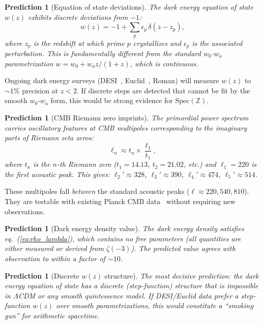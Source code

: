 \documentclass[11pt,a4paper]{article}
\newtheorem{prediction}[theorem]{Prediction}
\newcommand{\Spec}{\mathrm{Spec}}
\begin{document}
\begin{prediction}[Equation of state deviations]
\label{pred:wz}
The dark energy equation of state $w(z)$ exhibits discrete
deviations from $-1$:
\begin{equation}
  w(z) = -1 + \sum_p \epsilon_p \, \delta(z - z_p),
\end{equation}
where $z_p$ is the redshift at which prime $p$ crystallizes
and $\epsilon_p$ is the associated perturbation.
This is fundamentally different from the standard
$w_0$-$w_a$ parametrization $w = w_0 + w_a z/(1+z)$,
which is continuous.
\end{prediction}

Ongoing dark energy surveys (DESI~\cite{DESI2024},
Euclid~\cite{Euclid2024}, Roman) will measure $w(z)$ to
$\sim 1\%$ precision at $z < 2$. If discrete steps are
detected that cannot be fit by the smooth $w_0$-$w_a$ form,
this would be strong evidence for $\Spec(\mathbb{Z})$.

\begin{prediction}[CMB Riemann zero imprints]
\label{pred:cmb}
The primordial power spectrum carries oscillatory features
at CMB multipoles corresponding to the imaginary parts of
Riemann zeta zeros:
\begin{equation}
  \ell_n \approx t_n \times \frac{\ell_1}{t_1},
\end{equation}
where $t_n$ is the $n$-th Riemann zero ($t_1 = 14.13$,
$t_2 = 21.02$, etc.) and $\ell_1 = 220$ is the first
acoustic peak. This gives:
$\ell_2' \approx 328$, $\ell_3' \approx 390$,
$\ell_4' \approx 474$, $\ell_5' \approx 514$.
\end{prediction}

These multipoles fall \emph{between} the standard acoustic peaks
($\ell \approx 220, 540, 810$). They are testable with existing
Planck CMB data~\cite{Planck2018} without requiring new observations.

\begin{prediction}[Dark energy density value]
\label{pred:value}
The dark energy density satisfies
eq.~(\ref{eq:rho_lambda}), which contains no free parameters
(all quantities are either measured or derived from $\zeta(-3)$).
The predicted value agrees with observation to within a
factor of $\sim 10$.
\end{prediction}

\begin{prediction}[Discrete $w(z)$ structure]
\label{pred:discrete}
The most decisive prediction: the dark energy equation of state
has a discrete (step-function) structure that is
\emph{impossible} in $\Lambda$CDM or any smooth quintessence model.
If DESI/Euclid data prefer a step-function $w(z)$ over
smooth parametrizations, this would constitute a ``smoking gun''
for arithmetic spacetime.
\end{prediction}
\end{document}
